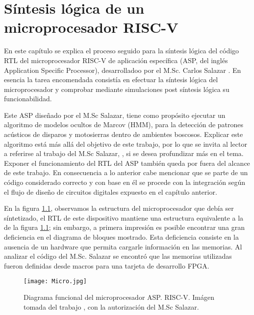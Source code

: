 \chapter{Síntesis lógica de un microprocesador RISC-V}
\label{ch:asp_syn}

En este capítulo se explica el proceso seguido para la síntesis lógica del código RTL del microprocesador RISC-V de aplicación específica (ASP, del inglés Application Specific Processor), desarrolladoo por el M.Sc. Carlos Salazar \cite{lascas_carlos, concapan}. En esencia la tarea encomendada consistía en efectuar la síntesis lógica del microprocesador y comprobar mediante simulaciones post síntesis lógica su funcionabilidad.

Este ASP diseñado por el M.Sc Salazar, tiene como propósito ejecutar un algoritmo de modelos ocultos de Marcov (HMM), para la detección de patrones acústicos de disparos y motosierras dentro de ambientes boscosos. Explicar este algoritmo está más allá del objetivo de este trabajo, por lo que se invita al lector a referirse al trabajo del M.Sc Salazar, \cite{Carlosthesis}, si se desea profundizar más en el tema. Exponer el funcionamiento del RTL del ASP también queda por fuera del alcance de este trabajo. En consecuencia a lo anterior cabe mencionar que se parte de un código considerado correcto y con base en él se procede con la integración según el flujo de diseño de circuitos digitales expuesto en el capítulo anterior. 


En la figura \ref{fig:micro}, observamos la estructura del microprocesador que debía ser síntetizado, el RTL de este dispositivo mantiene una estructura equivalente a la de la figura \ref{fig:micro}; sin embargo, a primera impresión es posible encontrar una gran deficiencia en el diagrama de bloques mostrado. Esta deficiencia consiste en la ausencia de un hardware que permita cargarle información en las memorias. Al analizar el código del M.Sc. Salazar se encontró que las memorias utilizadas fueron definidas desde macros para una tarjeta de desarrollo FPGA.

\begin{figure}[t]
\texttt{[image: Micro.jpg]}
\centering
\caption{Diagrama funcional del microprocesador ASP. RISC-V. Imágen tomada del trabajo \cite{Carlosthesis}, con la autorización del M.Sc Salazar.}
\label{fig:micro}
\end{figure}


